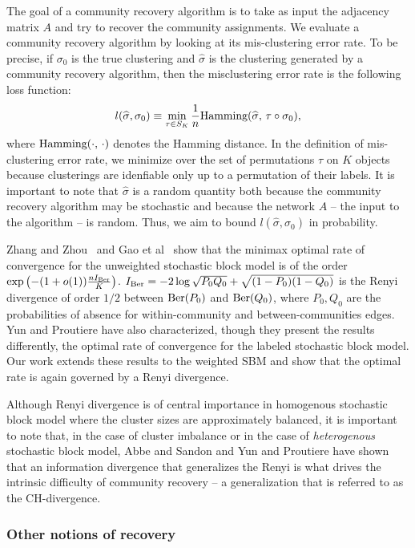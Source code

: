 \documentclass{article}
\begin{document}
The goal of a community recovery algorithm is to take as input the adjacency matrix $A$ and try to recover the community assignments. We evaluate a community recovery algorithm by looking at its mis-clustering error rate. To be precise, if $\sigma_0$ is the true clustering and $\hat{\sigma}$ is the clustering generated by a community recovery algorithm, then the misclustering error rate is the following loss function:
\[
l(\widehat{\sigma}, \sigma_0) \equiv \min_{\tau \in S_K} \frac{1}{n} \textrm{Hamming}(\widehat{\sigma},\, \tau \circ \sigma_0 ),
\]
where $\textrm{Hamming}(\cdot, \, \cdot)$ denotes the Hamming distance. In the definition of mis-clustering error rate, we minimize over the set of permutations $\tau$ on $K$ objects because clusterings are idenfiable only up to a permutation of their labels. It is important to note that $\hat{\sigma}$ is a random quantity both because the community recovery algorithm may be stochastic and because the network $A$ -- the input to the algorithm -- is random. Thus, we aim to bound $l(\hat{\sigma}, \sigma_0)$ in probability. 

Zhang and Zhou~\cite{zhangminimax} and Gao et al~\cite{gao2015achieving} show that the minimax optimal rate of convergence for the unweighted stochastic block model is of the order $\exp\left( - (1 + o(1)) \frac{n I_{\textrm{Ber}}}{K} \right)$. $I_{\textrm{Ber}} = -2 \log \sqrt{P_0 Q_0} + \sqrt{(1-P_0)(1-Q_0)}$ is the Renyi divergence of order $1/2$ between $\textrm{Ber}(P_0)$ and $\textrm{Ber}(Q_0)$, where $P_0, Q_0$ are the probabilities of absence for within-community and between-communities edges. Yun and Proutiere have also characterized, though they present the results differently, the optimal rate of convergence for the labeled stochastic block model. Our work extends these results to the weighted SBM and show that the optimal rate is again governed by a Renyi divergence.

Although Renyi divergence is of central importance in homogenous stochastic block model where the cluster sizes are approximately balanced, it is important to note that, in the case of cluster imbalance or in the case of \emph{heterogenous} stochastic block model, Abbe and Sandon \cite{AbbSan15} and Yun and Proutiere \cite{yun2016optimal} have shown that an information divergence that generalizes the Renyi is what drives the intrinsic difficulty of community recovery -- a generalization that is referred to as the CH-divergence.


\subsubsection{Other notions of recovery}
\end{document}

